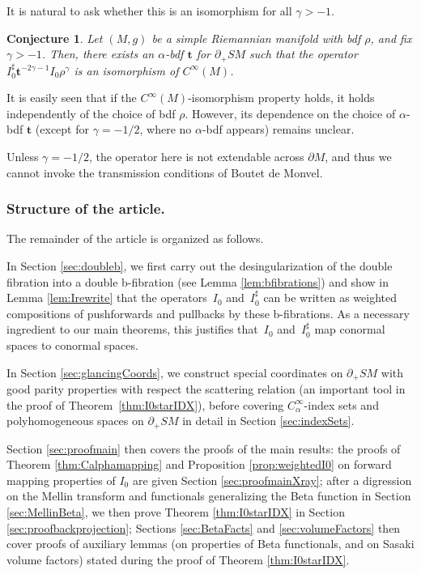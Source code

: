 \documentclass[11pt]{article}
\theoremstyle{plain}
\newtheorem{Conjecture}[Theorem]{Conjecture}
\theoremstyle{definition}
\theoremstyle{remark}
\newcommand{\bt}{{\boldsymbol{t}}}
\newcommand{\adj}{I_0^\sharp}
\newcommand{\del}{\partial}
\begin{document}
It is natural to ask whether this is an isomorphism for all $\gamma>-1$.
\begin{Conjecture} \label{conj}
Let $(M,g)$ be a simple Riemannian manifold with bdf $\rho$, and fix $\gamma>-1$. Then, there exists an $\alpha$-bdf $\bt$ for $\partial_+ SM$ such that the operator $\adj \bt^{-2\gamma-1} I_0 \rho^\gamma$ is an isomorphism of $C^\infty(M)$.
\end{Conjecture}

It is easily seen that if the $C^\infty(M)$-isomorphism property holds, it holds independently of the choice of bdf $\rho$. However, its dependence on the choice of $\alpha$-bdf $\bt$ (except for $\gamma=-1/2$, where no $\alpha$-bdf appears) remains unclear.

Unless $\gamma= -1/2$, the operator here is not extendable across $\del M$, and thus we cannot invoke the transmission conditions of Boutet de Monvel.

\subsubsection*{Structure of the article.} The remainder of the article is organized as follows.

In Section \ref{sec:doubleb}, we first carry out the desingularization of the double fibration into a double b-fibration (see Lemma \ref{lem:bfibrations}) and show in Lemma \ref{lem:Irewrite} that the operators~$I_0$ and~$I_0^\sharp$ can be written as weighted compositions of pushforwards and pullbacks by these b-fibrations. As a necessary ingredient to our main theorems, this justifies that~$I_0$ and~$I_0^\sharp$ map conormal spaces to conormal spaces.

In Section \ref{sec:glancingCoords}, we construct special coordinates on $\partial_+ SM$ with good parity properties with respect the scattering relation (an important tool in the proof of Theorem~\ref{thm:I0starIDX}), before covering $C_\alpha^\infty$-index sets and polyhomogeneous spaces on $\partial_+ SM$ in detail in Section \ref{sec:indexSets}.

Section \ref{sec:proofmain} then covers the proofs of the main results: the proofs of Theorem \ref{thm:Calphamapping} and Proposition \ref{prop:weightedI0} on forward mapping properties of $I_0$ are given Section \ref{sec:proofmainXray}; after a digression on the Mellin transform and functionals generalizing the Beta function in Section \ref{sec:MellinBeta}, we then prove Theorem \ref{thm:I0starIDX} in Section \ref{sec:proofbackprojection}; Sections \ref{sec:BetaFacts} and \ref{sec:volumeFactors} then cover proofs of auxiliary lemmas (on properties of Beta functionals, and on Sasaki volume factors) stated during the proof of Theorem \ref{thm:I0starIDX}.
\end{document}
